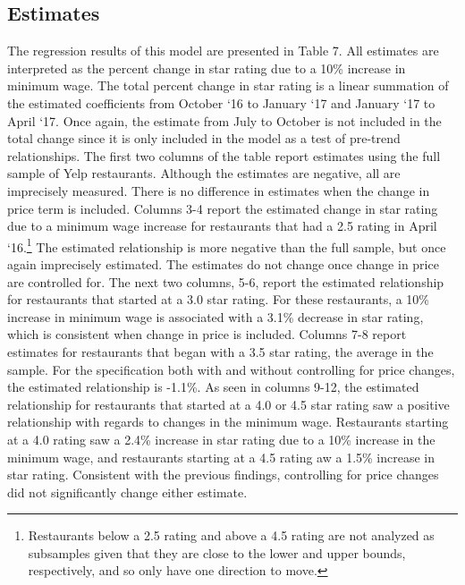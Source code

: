\documentclass[11pt]{article}
\begin{document}
\subsection{Estimates}
The regression results of this model are presented in Table 7. All estimates are interpreted as the percent change in star rating due to a 10\% increase in minimum wage. The total percent change in star rating is a linear summation of the estimated coefficients from October `16 to January `17 and January `17 to April `17. Once again, the estimate from July to October is not included in the total change since it is only included in the model as a test of pre-trend relationships. The first two columns of the table report estimates using the full sample of Yelp restaurants. Although the estimates are negative, all are imprecisely measured. There is no difference in estimates when the change in price term is included. Columns 3-4 report the estimated change in star rating due to a minimum wage increase for restaurants that had a 2.5 rating in April `16.\footnote{Restaurants below a 2.5 rating and above a 4.5 rating are not analyzed as subsamples given that they are close to the lower and upper bounds, respectively, and so only have one direction to move.} The estimated relationship is more negative than the full sample, but once again imprecisely estimated. The estimates do not change once change in price are controlled for. The next two columns, 5-6, report the estimated relationship for restaurants that started at a 3.0 star rating. For these restaurants, a 10\% increase in minimum wage is associated with a 3.1\% decrease in star rating, which is consistent when change in price is included. Columns 7-8 report estimates for restaurants that began with a 3.5 star rating, the average in the sample. For the specification both with and without controlling for price changes, the estimated relationship is -1.1\%. As seen in columns 9-12, the estimated relationship for restaurants that started at a 4.0 or 4.5 star rating saw a positive relationship with regards to changes in the minimum wage. Restaurants starting at a 4.0 rating saw a 2.4\% increase in star rating due to a 10\% increase in the minimum wage, and restaurants starting at a 4.5 rating aw a 1.5\% increase in star rating. Consistent with the previous findings, controlling for price changes did not significantly change either estimate. 
\end{document}
